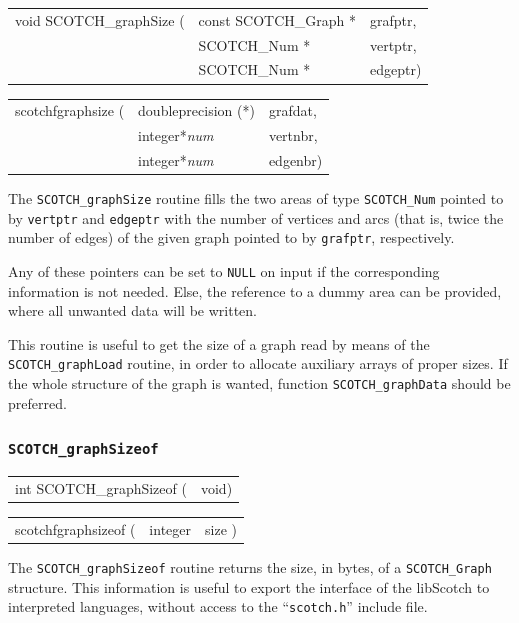 \begin{itemize}
\progsyn

{\tt\begin{tabular}{l@{}ll}
void SCOTCH\_graphSize ( & const SCOTCH\_Graph * & grafptr, \\
                         & SCOTCH\_Num *         & vertptr, \\
                         & SCOTCH\_Num *         & edgeptr)
\end{tabular}}

{\tt\begin{tabular}{l@{}ll}
scotchfgraphsize ( & doubleprecision (*) & grafdat, \\
                   & integer*{\it num}   & vertnbr, \\
                   & integer*{\it num}   & edgenbr)
\end{tabular}}

\progdes

The {\tt SCOTCH\_graphSize} routine fills the two areas of type
{\tt SCOTCH\_\lbt Num} pointed to by {\tt vertptr} and {\tt edgeptr}
with the number of vertices and arcs (that is, twice the number
of edges) of the given graph pointed to by {\tt grafptr},
respectively.

Any of these pointers can be set to {\tt NULL} on input if the
corresponding information is not needed. Else, the reference to a
dummy area can be provided, where all unwanted data will be written.

This routine is useful to get the size of a graph read by means
of the {\tt SCOTCH\_\lbt graph\lbo Load} routine, in order to allocate
auxiliary arrays of proper sizes. If the whole structure of the
graph is wanted, function {\tt SCOTCH\_graph\lbo Data} should be
preferred.
\end{itemize}

\subsubsection{{\tt SCOTCH\_graphSizeof}}

\begin{itemize}
\progsyn

{\tt\begin{tabular}{l@{}l}
int SCOTCH\_graphSizeof ( & void)
\end{tabular}}

{\tt\begin{tabular}{l@{}ll}
scotchfgraphsizeof ( & integer & size )
\end{tabular}}

\progdes

The {\tt SCOTCH\_graphSizeof} routine returns the size, in bytes, of a
{\tt SCOTCH\_\lbt Graph} structure. This information is useful to
export the interface of the {\sc libScotch} to interpreted languages,
without access to the ``{\tt scotch.h}'' include file.
\end{itemize}

